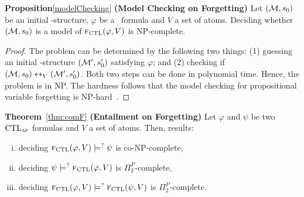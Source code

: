\documentclass{article}
\begin{document}
\textbf{Proposition}\ref{modelChecking}  \textbf{(Model Checking on Forgetting)} Let $({\cal M},s_0)$ be an initial \MPK-structure, $\varphi$ be a \CTL\ formula and $V$ a set of atoms. Deciding whether $({\cal M},s_0)$ is a model of ${\textsc{f}_{\textrm{CTL}}}(\varphi, V )$ is NP-complete.\\
\begin{proof}
The problem can be determined by the following two things: (1) guessing
an initial \MPK-structure $({\cal M}',s_0')$ satisfying $\varphi$; and
(2) checking if  $({\cal M}, s_0) \leftrightarrow_V ({\cal M}', s_0')$. Both two steps can be done in polynomial time.
 Hence, the problem is in NP.
The hardness follows that the model checking for propositional variable
forgetting is NP-hard~\cite{Zhang2008Properties}.
\end{proof}

\textbf{Theorem}~\ref{thm:comF} \textbf{(Entailment on Forgetting)}
Let $\varphi$ and $\psi$ be two $\textrm{CTL}_{\textsc{a} \textsc{f}}$  formulas and $V$ a set of atoms. Then,
results:
\begin{enumerate}[(i)]
  \item deciding  ${\textsc{f}_{\textrm{CTL}}}(\varphi, V ) \models^? \psi$ is co-NP-complete,
  \item deciding  $\psi \models^? {\textsc{f}_{\textrm{CTL}}}(\varphi, V)$ is $\Pi_2^P$-complete,
  \item deciding ${\textsc{f}_{\textrm{CTL}}}(\varphi, V) \models^? {\textsc{f}_{\textrm{CTL}}}(\psi, V)$ is $\Pi_2^P$-complete.
\end{enumerate}
\end{document}
